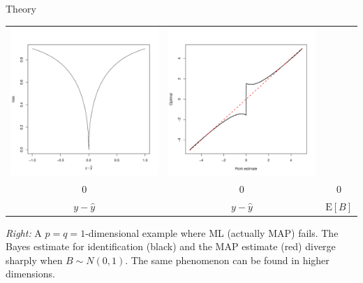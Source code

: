 \documentclass[final]{beamer}
\newlength{\onecolwid}
\begin{document}
\begin{frame}[t]
\begin{columns}[t]
\begin{column}{\onecolwid}
\begin{block}{Theory}
\begin{center}
\begin{tabular}{cc|c}
\includegraphics[scale = 0.6, trim = 1in 1in 0.5in 1in, clip]{loss_3.pdf} &
\includegraphics[scale = 0.6, trim = 1in 1in 0.5in 1in, clip]{zero2.pdf}\\
{\small 0} & {\small 0} & {\small 0}\\
{\small $ y - \hat{y}$} & {\small $y - \hat{y}$} & $\text{E}[B]$
\end{tabular}
\end{center}
{\small
\emph{Right:} A $p = q = 1$-dimensional example where ML (actually MAP) fails. The Bayes estimate for identification (black) and the MAP estimate (red)
diverge sharply when $B \sim N(0, 1)$.  The same phenomenon can be found in higher dimensions.
}
\end{block}


\end{column}
\end{columns}
\end{frame}
\end{document}
